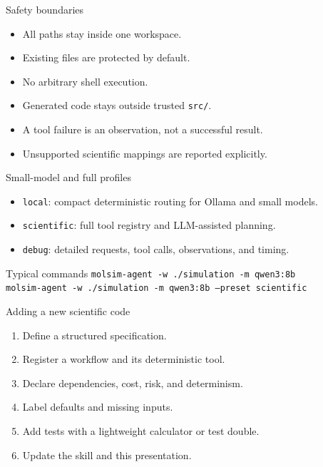 \documentclass[aspectratio=169,11pt]{beamer}
\begin{document}
\begin{frame}{Safety boundaries}
\begin{itemize}
  \item All paths stay inside one workspace.
  \item Existing files are protected by default.
  \item No arbitrary shell execution.
  \item Generated code stays outside trusted \texttt{src/}.
  \item A tool failure is an observation, not a successful result.
  \item Unsupported scientific mappings are reported explicitly.
\end{itemize}
\end{frame}

\begin{frame}{Small-model and full profiles}
\begin{itemize}
  \item \texttt{local}: compact deterministic routing for Ollama and small models.
  \item \texttt{scientific}: full tool registry and LLM-assisted planning.
  \item \texttt{debug}: detailed requests, tool calls, observations, and timing.
\end{itemize}
\begin{block}{Typical commands}
\texttt{molsim-agent -w ./simulation -m qwen3:8b}\\
\texttt{molsim-agent -w ./simulation -m qwen3:8b --preset scientific}
\end{block}
\end{frame}

\begin{frame}{Adding a new scientific code}
\begin{enumerate}
  \item Define a structured specification.
  \item Register a workflow and its deterministic tool.
  \item Declare dependencies, cost, risk, and determinism.
  \item Label defaults and missing inputs.
  \item Add tests with a lightweight calculator or test double.
  \item Update the skill and this presentation.
\end{enumerate}
\end{frame}
\end{document}
